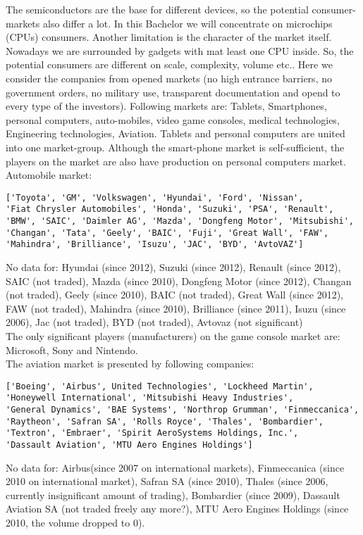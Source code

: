 \documentclass {article}
\begin{document}
The semiconductors are the base for different devices, so the potential consumer-markets also differ a lot. In this Bachelor we will concentrate on microchips (CPUs) consumers. Another limitation is the character of the market itself. Nowadays we are surrounded by gadgets with mat least one CPU inside. So, the potential consumers are different on scale, complexity, volume etc.. Here we consider the companies from opened markets (no high entrance barriers, no government orders, no military use, transparent documentation and opend to every type of the investors). Following markets are: Tablets, Smartphones, personal computers, auto-mobiles, video game consoles, medical technologies, Engineering technologies, Aviation. Tablets and personal computers are united into one market-group. Although the smart-phone market is self-sufficient, the players on the market are also have production on personal computers market.\\
Automobile market:
\begin{verbatim}
['Toyota', 'GM', 'Volkswagen', 'Hyundai', 'Ford', 'Nissan', 
'Fiat Chrysler Automobiles', 'Honda', 'Suzuki', 'PSA', 'Renault', 
'BMW', 'SAIC', 'Daimler AG', 'Mazda', 'Dongfeng Motor', 'Mitsubishi',
'Changan', 'Tata', 'Geely', 'BAIC', 'Fuji', 'Great Wall', 'FAW',
'Mahindra', 'Brilliance', 'Isuzu', 'JAC', 'BYD', 'AvtoVAZ']
\end{verbatim}
No data for: Hyundai (since 2012), Suzuki (since 2012), Renault (since 2012), SAIC (not traded), Mazda (since 2010), Dongfeng Motor (since 2012), Changan (not traded), Geely (since 2010), BAIC (not traded), Great Wall (since 2012), FAW (not traded), Mahindra (since 2010), Brilliance (since 2011), Isuzu (since 2006), Jac (not traded), BYD (not traded), Avtovaz (not significant)\\
The only significant players (manufacturers) on the game console market are: Microsoft, Sony and Nintendo.\\ 
The aviation market is presented by following companies: 
\begin{verbatim}
['Boeing', 'Airbus', United Technologies', 'Lockheed Martin',
'Honeywell International', 'Mitsubishi Heavy Industries',
'General Dynamics', 'BAE Systems', 'Northrop Grumman', 'Finmeccanica',
'Raytheon', 'Safran SA', 'Rolls Royce', 'Thales', 'Bombardier',
'Textron', 'Embraer', 'Spirit AeroSystems Holdings, Inc.',
'Dassault Aviation', 'MTU Aero Engines Holdings']
\end{verbatim}
No data for: Airbus(since 2007 on international markets), Finmeccanica (since 2010 on international market), Safran SA (since 2010), Thales (since 2006, currently insignificant amount of trading), Bombardier (since 2009), Dassault Aviation SA (not traded freely any more?), MTU Aero Engines Holdings (since 2010, the volume dropped to 0).\\
\end{document}
